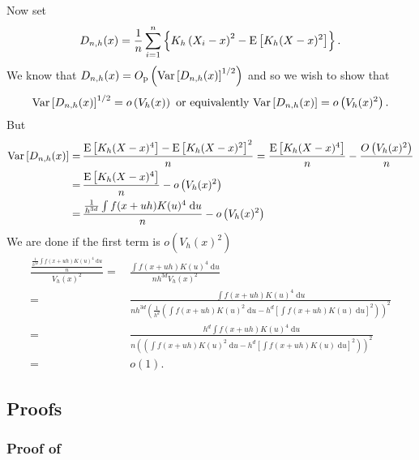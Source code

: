 Now set
\begin{equation*}
  D_{n, h} (x) = \frac{1}{n} \sum_{i = 1}^{n} \left\{ K_{h} \left( X_{i} - x
  \right)^{2} - \mathrm{E} \left[ K_{h} (X - x)^{2} \right] \right\}.
\end{equation*}
We know that \(D_{n, h} (x) = O_{\mathrm{p}} \left( \mathrm{Var} \left[ D_{n, h} (x)
\right]^{1 / 2} \right)\) and so we wish to show that
\begin{equation*}
  \mathrm{Var} \left[ D_{n, h} (x) \right]^{1 / 2} = o \left( V_{h} (x) \right) \text{
  or equivalently } \mathrm{Var} \left[ D_{n, h} (x) \right] = o \left( V_{h}
  (x)^{2} \right).
\end{equation*}
But
\begin{align*}
  \mathrm{Var} \left[ D_{n, h} (x) \right] =
  & \, \frac{\mathrm{E} \left[ K_{h} (X - x)^{4} \right] - \mathrm{E} \left[ K_{h} (X - x)^{2}
  \right]^{2}}{n} = \frac{\mathrm{E} \left[ K_{h} (X - x)^{4} \right]}{n} - \frac{O
  \left( V_{h} (x)^{2} \right)}{n} \\
  =
  & \, \frac{\mathrm{E} \left[ K_{h} (X - x)^{4} \right]}{n} - o \left( V_{h} (x)^{2}
  \right) \\
  =
  & \, \frac{\frac{1}{h^{3 d}} \int f (x + u h) K (u)^{4} \; \mathrm{d} u}{n} -
  o \left( V_{h} (x)^{2} \right)
\end{align*}
We are done if the first term is \(o \left( V_{h} (x)^{2} \right)\)
\begin{align*}
  \frac{\frac{\frac{1}{h^{3 d}} \int f (x + u h) K (u)^{4} \; \mathrm{d}
  u}{n}}{V_{h} (x)^{2}} =
  & \, \frac{\int f (x + u h) K (u)^{4} \; \mathrm{d} u}{n h^{3 d} V_{h}
  (x)^{2}} \\
  =
  & \, \frac{\int f (x + u h) K (u)^{4} \; \mathrm{d} u}{n h^{3 d} \left(
  \frac{1}{h^{d}} \left( \int f (x + u h) K (u)^{2} \; \mathrm{d} u - h^{d}
  \left[ \int f (x + u h) K (u) \; \mathrm{d} u \right]^{2} \right) \right)^{2}}
  \\
  =
  & \, \frac{h^{d} \int f (x + u h) K (u)^{4} \; \mathrm{d} u}{n \left(
  \left( \int f (x + u h) K (u)^{2} \; \mathrm{d} u - h^{d}
  \left[ \int f (x + u h) K (u) \; \mathrm{d} u \right]^{2} \right) \right)^{2}}
  \\
  =
  & \, o (1).
\end{align*}

\subsection{Proofs}

\subsubsection{Proof of
\texorpdfstring{}{Theorem
\ref{thm--kde-asymptotic-normality-usual}}}


